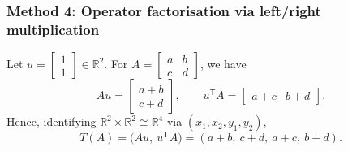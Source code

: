 \documentclass[12pt]{article}
\begin{document}
\subsubsection{Method 4: Operator factorisation via left/right multiplication}
Let $u=\begin{bmatrix}1\\1\end{bmatrix}\in\mathbb{R}^2$.
For $A=\begin{bmatrix}a&b\\c&d\end{bmatrix}$, we have
\[
Au=\begin{bmatrix}a+b\\c+d\end{bmatrix},\qquad
u^{\mathsf T}A=\begin{bmatrix}a+c & b+d\end{bmatrix}.
\]
Hence, identifying $\mathbb{R}^2\times \mathbb{R}^2\cong\mathbb{R}^4$ via $(x_1,x_2,y_1,y_2)$,
\[
T(A)=\big(Au,\ u^{\mathsf T}A\big)=(a+b,\ c+d,\ a+c,\ b+d).
\]
\end{document}
